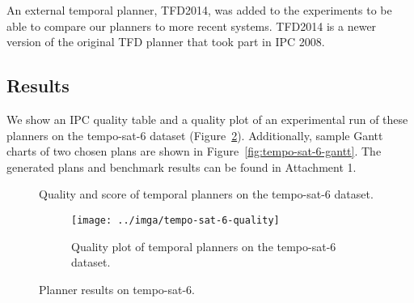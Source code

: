 An external temporal planner, TFD2014, was added to the experiments
to be able to compare our planners to more recent systems.
TFD2014 is a newer version of the original TFD planner that took part in IPC 2008.

\subsection{Results}\label{temporal-results}

We show an IPC quality table and a quality plot of an experimental run of these planners on the tempo-sat-6 dataset (Figure~\ref{fig:tempo-sat-6-results}).
Additionally, sample Gantt charts \citep{Gantt1910} of two chosen plans are shown in Figure~\ref{fig:tempo-sat-6-gantt}.
The generated plans and benchmark results can be found in Attachment 1.

\begin{figure}[tbp]
\centering
\begin{subtable}{\textwidth}
\centering
\scriptsize
\setlength{\tabcolsep}{4.6pt}
\renewcommand{\footnotesize}{\scriptsize}

\caption{Quality and score of temporal planners on the tempo-sat-6 dataset.}
\label{tab:tempo-sat-6-ipc-scores}
\end{subtable}

\vspace{0.5cm}
\begin{subfigure}{\textwidth}
\centering
\texttt{[image: ../imga/tempo-sat-6-quality]}
\caption{Quality plot of temporal planners on the tempo-sat-6 dataset.}
\label{fig:tempo-sat-6-quality}
\end{subfigure}
\caption{Planner results on tempo-sat-6.}
\label{fig:tempo-sat-6-results}
\end{figure}

